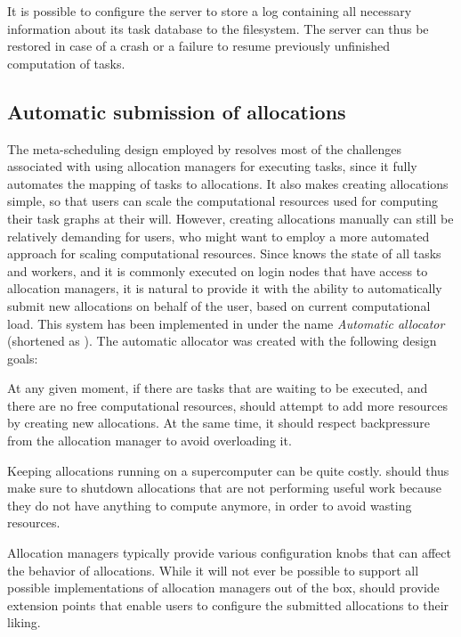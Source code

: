 It is possible to configure the server to store a log containing all necessary information about
its task database to the filesystem. The server can thus be restored in case of a crash or a
failure to resume previously unfinished computation of tasks.

\subsection{Automatic submission of allocations}
\label{hq:automatic-allocation}
The meta-scheduling design employed by \hyperqueue{} resolves most of the challenges
associated with using allocation managers for executing tasks, since it fully automates the mapping
of tasks to allocations. It also makes creating allocations simple, so that users can scale the
computational resources used for computing their task graphs at their will. However, creating
allocations manually can still be relatively demanding for users, who might want to employ a more
automated approach for scaling computational resources. Since \hyperqueue{} knows the
state of all tasks and workers, and it is commonly executed on login nodes that have access to
allocation managers, it is natural to provide it with the ability to automatically submit new
allocations on behalf of the user, based on current computational load. This system has been
implemented in \hq{} under the name \emph{Automatic allocator} (shortened as \autoalloc{}). The automatic
allocator was created with the following design goals:

\begin{description}[wide=0pt]
	\item[Allow computational resources to scale up] At any given moment, if there are tasks that are waiting to be executed, and there are no free
		computational resources, \autoalloc{} should attempt to add more resources by creating
		new allocations. At the same time, it should respect backpressure from the allocation manager to
		avoid overloading it.
	\item[Allow computational resources to scale down] Keeping allocations running on a supercomputer can be quite costly. \Autoalloc{} should
		thus make sure to shutdown allocations that are not performing useful work because they do not have
		anything to compute anymore, in order to avoid wasting resources.
	\item[Be flexible] Allocation managers typically provide various configuration knobs that can affect the behavior of
		allocations. While it will not ever be possible to support all possible implementations of
		allocation managers out of the box, \autoalloc{} should provide extension points that
		enable users to configure the submitted allocations to their liking.
\end{description}

